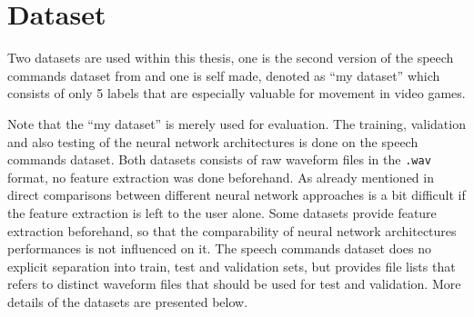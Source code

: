 
\section{Dataset}\label{sec:exp_dataset}
Two datasets are used within this thesis, one is the second version of the speech commands dataset from \cite{Warden2018} and one is self made, denoted as \enquote{my dataset} which consists of only 5 labels that are especially valuable for movement in video games.


Note that the \enquote{my dataset} is merely used for evaluation.
The training, validation and also testing of the neural network architectures is done on the speech commands dataset.
Both datasets consists of raw waveform files in the \texttt{.wav} format, no feature extraction was done beforehand.
As already mentioned in  direct comparisons between different neural network approaches is a bit difficult if the feature extraction is left to the user alone.
Some datasets provide feature extraction beforehand, so that the comparability of neural network architectures performances is not influenced on it.
The speech commands dataset does no explicit separation into train, test and validation sets, but provides file lists that refers to distinct waveform files that should be used for test and validation.
More details of the datasets are presented below.




% 


